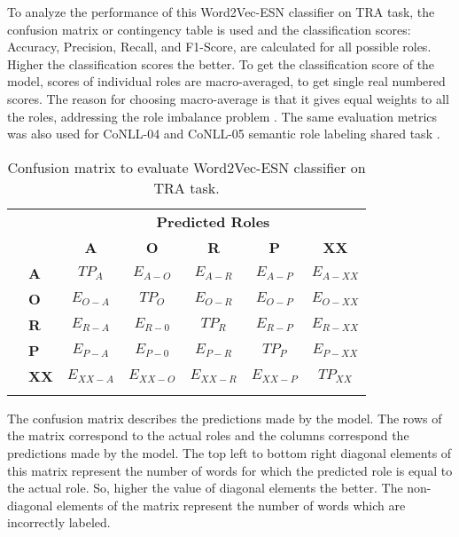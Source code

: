 To analyze the performance of this Word2Vec-ESN classifier on TRA task, the confusion matrix or contingency table \cite{confusion_martrix:1998} is used and the classification scores: Accuracy, Precision, Recall, and F1-Score, are calculated for all possible roles. Higher the classification scores the better. To get the classification score of the model, scores of individual roles are macro-averaged, to get single real numbered scores. The reason for choosing macro-average is that it gives equal weights to all the roles, addressing the role imbalance problem \cite{macro_average:2005}. The same evaluation metrics was also used for CoNLL-04 and CoNLL-05 semantic role labeling shared task \cite{conll:2004,conll:2005}.

\begin{table}[H]
\centering
\caption{Confusion matrix to evaluate Word2Vec-ESN classifier on TRA task.}
\label{tab:argument-predicate}
\begin{tabular}{l|l|c|c|c|c|c|}
\multicolumn{2}{c}{}  &\multicolumn{5}{c}{\textbf{Predicted Roles}}\\
\cline{3-7}
\multicolumn{2}{c|}{} & \textbf{A} & \textbf{O} & \textbf{R} & \textbf{P} & \textbf{XX}\\
\hhline{|~|*6-|}
\multirow{5}{*}{\textbf{True Roles}}
& \textbf{A}     & \cellcolor{gray!25}$TP_{A}$ & $E_{A-O}$ & $E_{A-R}$ & $E_{A-P}$ & $E_{A-XX}$ \\
\hhline{~|*6-}
& \textbf{O}     & $E_{O-A}$ &\cellcolor{gray!25} $TP_{O}$ & $E_{O-R}$ & $E_{O-P}$ & $E_{O-XX}$ \\
\hhline{~|*6-}
& \textbf{R}     & $E_{R-A}$ & $E_{R-0}$ & \cellcolor{gray!25}$TP_{R}$ & $E_{R-P}$ & $E_{R-XX}$ \\
\hhline{~|*6-}
& \textbf{P}     & $E_{P-A}$ & $E_{P-0}$ & $E_{P-R}$ & \cellcolor{gray!25}$TP_{P}$ & $E_{P-XX}$ \\
\hhline{~|*6-}
& \textbf{XX}     & $E_{XX-A}$ & $E_{XX-O}$ & $E_{XX-R}$ & $E_{XX-P}$ & \cellcolor{gray!25}$TP_{XX}$ \\
\hhline{~|*6-}
\end{tabular}
\end{table}

The confusion matrix describes the predictions made by the model. The rows of the matrix correspond to the actual roles and the columns correspond the predictions made by the model. The top left to bottom right diagonal elements of this matrix represent the number of words for which the predicted role is equal to the actual role. So, higher the value of diagonal elements the better. The non-diagonal elements of the matrix represent the number of words which are incorrectly labeled. 

